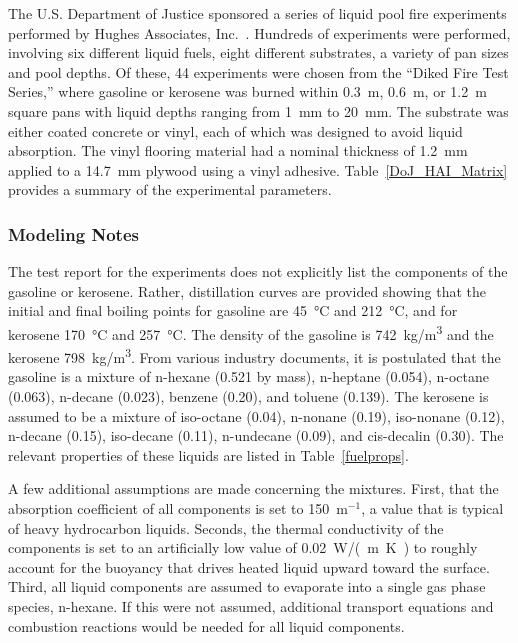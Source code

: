 The U.S. Department of Justice sponsored a series of liquid pool fire experiments performed by Hughes Associates, Inc.~\cite{Mealy:DoJ_HAI_Pool_Fires}. Hundreds of experiments were performed, involving six different liquid fuels, eight different substrates, a variety of pan sizes and pool depths. Of these, 44 experiments were chosen from the ``Diked Fire Test Series,'' where gasoline or kerosene was burned within 0.3~m, 0.6~m, or 1.2~m square pans with liquid depths ranging from 1~mm to 20~mm. The substrate was either coated concrete or vinyl, each of which was designed to avoid liquid absorption. The vinyl flooring material had a nominal thickness of 1.2~mm applied to a 14.7~mm plywood using a vinyl adhesive. Table~\ref{DoJ_HAI_Matrix} provides a summary of the experimental parameters.

\subsubsection{Modeling Notes}

The test report for the experiments does not explicitly list the components of the gasoline or kerosene. Rather, distillation curves are provided showing that the initial and final boiling points for gasoline are 45~\unit{\degreeCelsius} and 212~\unit{\degreeCelsius}, and for kerosene 170~\unit{\degreeCelsius} and 257~\unit{\degreeCelsius}. The density of the gasoline is 742~\unit{kg/m^3} and the kerosene 798~\unit{kg/m^3}. From various industry documents, it is postulated that the gasoline is a mixture of n-hexane (0.521 by mass), n-heptane (0.054), n-octane (0.063), n-decane (0.023), benzene (0.20), and toluene (0.139). The kerosene is assumed to be a mixture of iso-octane (0.04), n-nonane (0.19), iso-nonane (0.12), n-decane (0.15), iso-decane (0.11), n-undecane (0.09), and cis-decalin (0.30). The relevant properties of these liquids are listed in Table~\ref{fuelprops}.

A few additional assumptions are made concerning the mixtures. First, that the absorption coefficient of all components is set to 150~m$^{-1}$, a value that is typical of heavy hydrocarbon liquids. Seconds, the thermal conductivity of the components is set to an artificially low value of 0.02~\unit{W/(m.K)} to roughly account for the buoyancy that drives heated liquid upward toward the surface. Third, all liquid components are assumed to evaporate into a single gas phase species, n-hexane. If this were not assumed, additional transport equations and combustion reactions would be needed for all liquid components.

